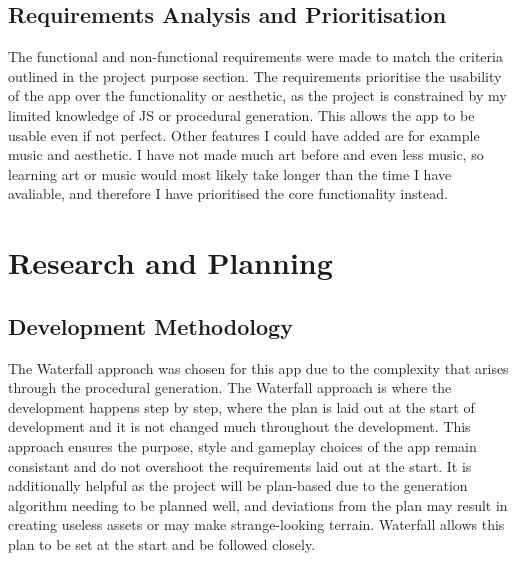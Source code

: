 \documentclass[14pt]{article}
\begin{document}
\subsection{Requirements Analysis and Prioritisation}
The functional and non-functional requirements were made to match the criteria outlined in the project purpose section. The requirements prioritise the usability of the app over the functionality or aesthetic, as the project is constrained by my limited knowledge of JS or procedural generation. This allows the app to be usable even if not perfect.
Other features I could have added are for example music and aesthetic. I have not made much art before and even less music, so learning art or music would most likely take longer than the time I have avaliable, and therefore I have prioritised the core functionality instead.


\section{Research and Planning}

\subsection{Development Methodology}
The Waterfall approach was chosen for this app due to the complexity that arises through the procedural generation. The Waterfall approach is where the development happens step by step, where the plan is laid out at the start of development and it is not changed much throughout the development.
This approach ensures the purpose, style and gameplay choices of the app remain consistant and do not overshoot the requirements laid out at the start. It is additionally helpful as the project will be plan-based due to the generation algorithm needing to be planned well, and deviations from the plan may result in creating useless assets or may make strange-looking terrain. Waterfall allows this plan to be set at the start and be followed closely.
\end{document}
